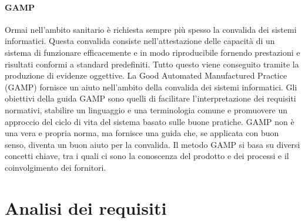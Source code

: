  \paragraph{GAMP}
  Ormai nell'ambito sanitario è richiesta sempre più spesso la convalida dei sistemi informatici. Questa 
  convalida consiste nell'attestazione delle capacità di un sistema di funzionare efficacemente e in modo 
  riproducibile fornendo prestazioni e risultati conformi a standard predefiniti. Tutto questo viene conseguito 
  tramite la produzione di evidenze oggettive.
  La Good Automated Manufactured Practice (GAMP) fornisce un aiuto nell'ambito della convalida dei sistemi informatici. 
  Gli obiettivi della guida GAMP sono quelli di facilitare l'interpretazione dei requisiti normativi, 
  stabilire un linguaggio e una terminologia comune e promuovere un approccio del ciclo di vita del sistema 
  basato sulle buone pratiche. GAMP non è una vera e propria norma, ma fornisce una guida che, se applicata 
  con buon senso, diventa un buon aiuto per la convalida. 
  Il metodo GAMP si basa su diversi concetti chiave, tra i quali ci sono la conoscenza del prodotto e dei processi e 
  il coinvolgimento dei fornitori.



  \section{Analisi dei requisiti}
